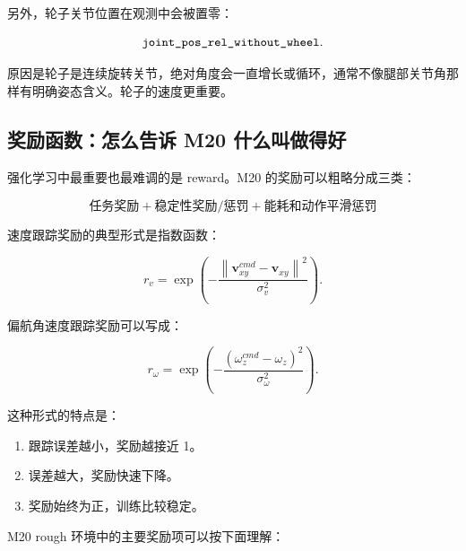 \documentclass[UTF8,11pt,a4paper]{ctexart}
\newcommand{\bs}[1]{\bm{#1}}
\begin{document}
另外，轮子关节位置在观测中会被置零：

\[
\text{\texttt{joint\_pos\_rel\_without\_wheel}}.
\]

原因是轮子是连续旋转关节，绝对角度会一直增长或循环，通常不像腿部关节角那样有明确姿态含义。轮子的速度更重要。

\subsection{奖励函数：怎么告诉 M20 什么叫做得好}

强化学习中最重要也最难调的是 reward。M20 的奖励可以粗略分成三类：

\[
\boxed{
\text{任务奖励}
+
\text{稳定性奖励/惩罚}
+
\text{能耗和动作平滑惩罚}
}
\]

速度跟踪奖励的典型形式是指数函数：

\[
r_{v}
=
\exp
\left(
-
\frac{
\left\|
\bs v_{xy}^{cmd}
-
\bs v_{xy}
\right\|^2
}{
\sigma_v^2
}
\right).
\]

偏航角速度跟踪奖励可以写成：

\[
r_{\omega}
=
\exp
\left(
-
\frac{
\left(
\omega_z^{cmd}
-
\omega_z
\right)^2
}{
\sigma_\omega^2
}
\right).
\]

这种形式的特点是：

\begin{enumerate}
  \item 跟踪误差越小，奖励越接近 1。
  \item 误差越大，奖励快速下降。
  \item 奖励始终为正，训练比较稳定。
\end{enumerate}

M20 rough 环境中的主要奖励项可以按下面理解：
\end{document}
